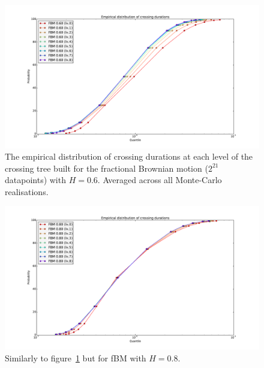 \documentclass[a4paper]{article}
\begin{document}
\begin{figure}[htb]\begin{center}
    \includegraphics[width=6in]{images/fig_09_med_FBM_060}
    \caption{The empirical distribution of crossing durations at each level of the
    crossing tree built for the fractional Brownian motion ($2^{21}$ datapoints) with $H = 0.6$.
    Averaged across all Monte-Carlo realisations.}
\label{fig:fbm_quantiles_06}
\end{center}\end{figure}

\begin{figure}[htb]\begin{center}
    \includegraphics[width=6in]{images/fig_09_med_FBM_080}
    \caption{Similarly to figure~\ref{fig:fbm_quantiles_06} but for fBM with $H=0.8$.}
\label{fig:fbm_quantiles_08}
\end{center}\end{figure}
\end{document}
